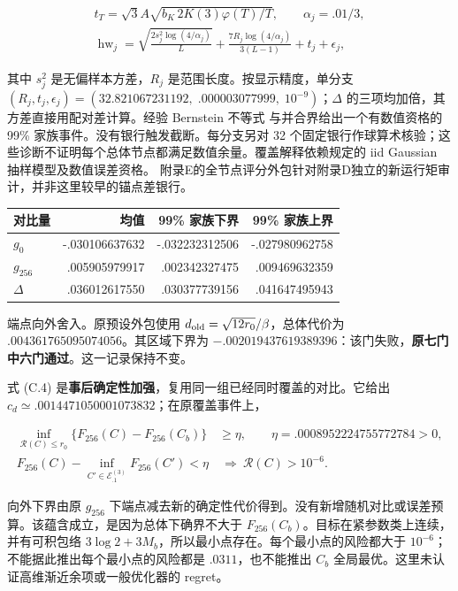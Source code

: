 \documentclass[11pt,a4paper]{article}
\begin{document}
\[
\begin{gathered}
t_T=\sqrt3A\sqrt{b_K\,2K(3)\varphi(T)/T},\qquad\alpha_j=.01/3,\\
\operatorname{hw}_j=\sqrt{\frac{2s_j^2\log(4/\alpha_j)}L}
+\frac{7R_j\log(4/\alpha_j)}{3(L-1)}+t_j+\epsilon_j,
\end{gathered}
\tag{C.6}
\]

其中 \(s_j^2\) 是无偏样本方差，\(R_j\) 是范围长度。按显示精度，单分支
\((R_j,t_j,\epsilon_j)=(32.821067231192,\; .000003077999,\;10^{-9})\)；\(\Delta\)
的三项均加倍，其方差直接用配对差计算。经验 Bernstein 不等式
\citep[Theorem 4]{maurer2009} 与并合界给出一个有数值资格的 99\%
家族事件。没有银行触发截断。每分支另对 32
个固定银行作球算术核验；这些诊断不证明每个总体节点都满足数值余量。覆盖解释依赖规定的
iid Gaussian 抽样模型及数值误差资格。
附录E的全节点评分外包针对附录D独立的新运行矩审计，并非这里较早的锚点差银行。

\begin{longtable}[]{@{}lrrr@{}}
\toprule\noalign{}
对比量 & 均值 & 99\% 家族下界 & 99\% 家族上界 \\
\midrule\noalign{}
\endhead
\bottomrule\noalign{}
\endlastfoot
\(g_0\) & -.030106637632 & -.032232312506 & -.027980962758 \\
\(g_{256}\) & .005905979917 & .002342327475 & .009469632359 \\
\(\Delta\) & .036012617550 & .030377739156 & .041647495943 \\
\end{longtable}

端点向外舍入。原预设外包使用
\(d_{\rm old}=\sqrt{12r_0}/\beta\)，总体代价为
\(.004361765095074056\)。其区域下界为
\(-.002019437619389396\)：该门失败，\textbf{原七门中六门通过}。这一记录保持不变。

式 (C.4) 是\textbf{事后确定性加强}，复用同一组已经同时覆盖的对比。它给出
\(c_d\simeq.0014471050001073832\)；在原覆盖事件上，

\[
\begin{aligned}
\inf_{\mathcal R(C)\le r_0}\{F_{256}(C)-F_{256}(C_b)\}&\ge\eta,
\qquad\eta=.0008952224755772784>0,\\
F_{256}(C)-\inf_{C'\in\mathcal E_{.1}^{(3)}}F_{256}(C')<\eta
&\ \Longrightarrow\ \mathcal R(C)>10^{-6}.
\end{aligned}
\tag{C.7}
\]

向外下界由原 \(g_{256}\)
下端点减去新的确定性代价得到。没有新增随机对比或误差预算。该蕴含成立，是因为总体下确界不大于
\(F_{256}(C_b)\)。目标在紧参数类上连续，并有可积包络
\(3\log2+3M_b\)，所以最小点存在。每个最小点的风险都大于
\(10^{-6}\)；不能据此推出每个最小点的风险都是 \(.0311\)，也不能推出
\(C_b\) 全局最优。这里未认证高维渐近余项或一般优化器的 regret。
\end{document}
